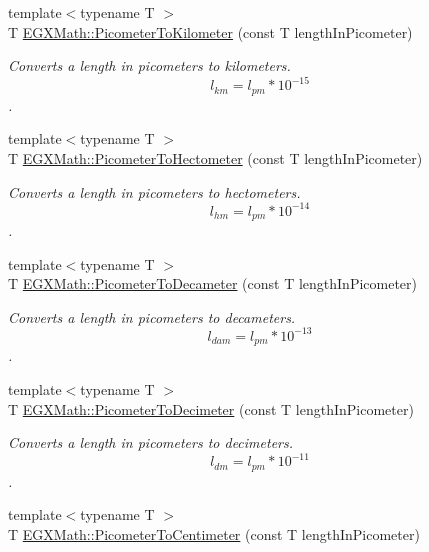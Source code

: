 \begin{DoxyCompactItemize}
{\footnotesize template$<$typename T $>$ }\\T \mbox{\hyperlink{group___e_g_x_math-_conversions-_length_conversions-_picometer-_s_i_ga8a1f5000b027dfc9980738a0565c773e}{E\+G\+X\+Math\+::\+Picometer\+To\+Kilometer}} (const T length\+In\+Picometer)
\begin{DoxyCompactList}\small\item\em Converts a length in picometers to kilometers. \[ l_{km}=l_{pm} * 10^{-15} \]. \end{DoxyCompactList}\item 
{\footnotesize template$<$typename T $>$ }\\T \mbox{\hyperlink{group___e_g_x_math-_conversions-_length_conversions-_picometer-_s_i_ga51eebefd8810385585aa33ca80ac6e93}{E\+G\+X\+Math\+::\+Picometer\+To\+Hectometer}} (const T length\+In\+Picometer)
\begin{DoxyCompactList}\small\item\em Converts a length in picometers to hectometers. \[ l_{hm}=l_{pm} * 10^{-14} \]. \end{DoxyCompactList}\item 
{\footnotesize template$<$typename T $>$ }\\T \mbox{\hyperlink{group___e_g_x_math-_conversions-_length_conversions-_picometer-_s_i_gac3123f93cc73d11cefa26073dc2c46a5}{E\+G\+X\+Math\+::\+Picometer\+To\+Decameter}} (const T length\+In\+Picometer)
\begin{DoxyCompactList}\small\item\em Converts a length in picometers to decameters. \[ l_{dam}=l_{pm} * 10^{-13} \]. \end{DoxyCompactList}\item 
{\footnotesize template$<$typename T $>$ }\\T \mbox{\hyperlink{group___e_g_x_math-_conversions-_length_conversions-_picometer-_s_i_gab0d70362fb21996562efb9c22d9bacf4}{E\+G\+X\+Math\+::\+Picometer\+To\+Decimeter}} (const T length\+In\+Picometer)
\begin{DoxyCompactList}\small\item\em Converts a length in picometers to decimeters. \[ l_{dm}=l_{pm} * 10^{-11} \]. \end{DoxyCompactList}\item 
{\footnotesize template$<$typename T $>$ }\\T \mbox{\hyperlink{group___e_g_x_math-_conversions-_length_conversions-_picometer-_s_i_gabb7609315d88da8dd25575caf15a5e06}{E\+G\+X\+Math\+::\+Picometer\+To\+Centimeter}} (const T length\+In\+Picometer)

\end{DoxyCompactItemize}
